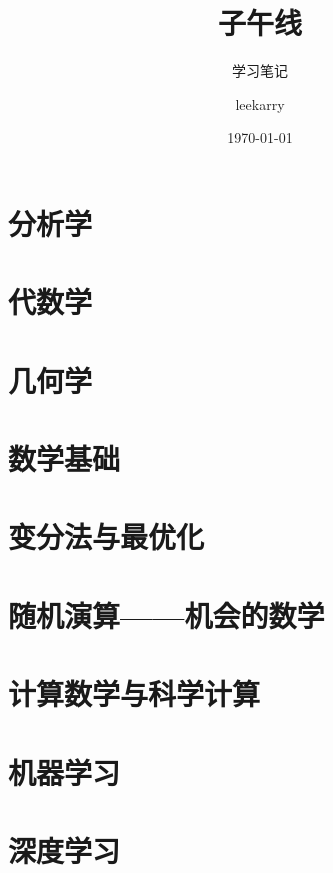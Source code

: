 \documentclass[cn,fancy,blue,11pt]{elegantbook}
\title{子午线}
\subtitle{学习笔记}
\author{leekarry}
\institute{果壳}
\date{\today}
\begin{document}
\maketitle
\tableofcontents


\mainmatter
\hypersetup{pageanchor=true}

\part{分析学}

\part{代数学}

\part{几何学}

\part{数学基础}

\part{变分法与最优化}

\part{随机演算——机会的数学}

\part{计算数学与科学计算}

\part{机器学习}

\part{深度学习}

\end{document}
